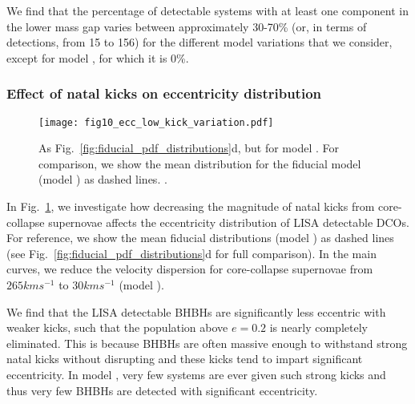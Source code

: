 We find that the percentage of detectable systems with at least one component in the lower mass gap varies between approximately 30-70\% (or, in terms of detections, from 15 to 156) for the different model variations that we consider, except for model \modRapid{}, for which it is 0\%. 


\subsubsection{Effect of natal kicks on eccentricity distribution}

\begin{figure}[tb]
    \centering
    \texttt{[image: fig10\_ecc\_low\_kick\_variation.pdf]}
    \caption{As Fig.~\ref{fig:fiducial_pdf_distributions}d, but for model \modSigLower{}. For comparison, we show the mean distribution for the fiducial model (model \modFid{}) as dashed lines. \href{https://github.com/TomWagg/detecting-DCOs-in-LISA/blob/main/paper/figures/fig10_ecc_low_kick_variation.pdf}{\faFileImage} \href{https://github.com/TomWagg/detecting-DCOs-in-LISA/blob/main/paper/figure_notebooks/variations.ipynb}{\faBook}.}
    \label{fig:ecc_low_kick_variation}
\end{figure}

In Fig.~\ref{fig:ecc_low_kick_variation}, we investigate how decreasing the magnitude of natal kicks from core-collapse supernovae affects the eccentricity distribution of LISA detectable DCOs. For reference, we show the mean fiducial distributions (model \modFid{}) as dashed lines (see Fig.~\ref{fig:fiducial_pdf_distributions}d for full comparison). In the main curves, we reduce the velocity dispersion for core-collapse supernovae from $265 \unit{km}{s^{-1}}$ to $30 \unit{km}{s^{-1}}$ (model \modSigLower{}).

We find that the LISA detectable BHBHs are significantly less eccentric with weaker kicks, such that the population above $e = 0.2$ is nearly completely eliminated. This is because BHBHs are often massive enough to withstand strong natal kicks without disrupting and these kicks tend to impart significant eccentricity. In model \modSigLower{}, very few systems are ever given such strong kicks and thus very few BHBHs are detected with significant eccentricity.

